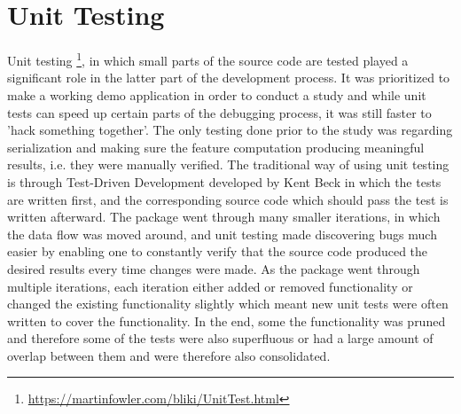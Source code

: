 \section{Unit Testing}
Unit testing \footnote{\url{https://martinfowler.com/bliki/UnitTest.html}}, in which small parts of the source code are tested played a significant role in the latter part of the development process. It was prioritized to make a working demo application in order to conduct a study and while unit tests can speed up certain parts of the debugging process, it was still faster to 'hack something together'. The only testing done prior to the study was regarding serialization and making sure the feature computation producing meaningful results, i.e. they were manually verified. The traditional way of using unit testing is through Test-Driven Development developed by Kent Beck \cite{beck-tdd} in which the tests are written first, and the corresponding source code which should pass the test is written afterward. The package went through many smaller iterations, in which the data flow was moved around, and unit testing made discovering bugs much easier by enabling one to constantly verify that the source code produced the desired results every time changes were made. As the package went through multiple iterations, each iteration either added or removed functionality or changed the existing functionality slightly which meant new unit tests were often written to cover the functionality. In the end, some the functionality was pruned and therefore some of the tests were also superfluous or had a large amount of overlap between them and were therefore also consolidated. 

